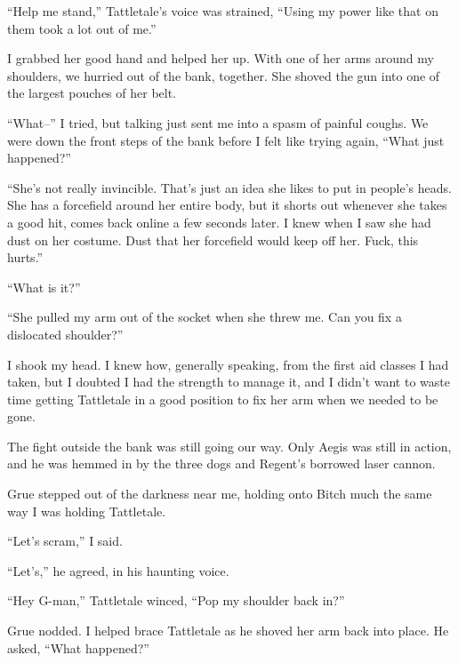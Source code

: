 ``Help me stand,'' Tattletale's voice was strained, ``Using my power like that on them took a lot out of me.''



I grabbed her good hand and helped her up.  With one of her arms around my shoulders, we hurried out of the bank, together.  She shoved the gun into one of the largest pouches of her belt.



``What--'' I tried, but talking just sent me into a spasm of painful coughs.  We were down the front steps of the bank before I felt like trying again, ``What just happened?''



``She's not really invincible.  That's just an idea she likes to put in people's heads.  She has a forcefield around her entire body, but it shorts out whenever she takes a good hit, comes back online a few seconds later.  I knew when I saw she had dust on her costume.  Dust that her forcefield would keep off her.  Fuck, this hurts.''



``What is it?''



``She pulled my arm out of the socket when she threw me.  Can you fix a dislocated shoulder?''



I shook my head.  I knew how, generally speaking, from the first aid classes I had taken, but I doubted I had the strength to manage it, and I didn't want to waste time getting Tattletale in a good position to fix her arm when we needed to be gone.



The fight outside the bank was still going our way.  Only Aegis was still in action, and he was hemmed in by the three dogs and Regent's borrowed laser cannon.



Grue stepped out of the darkness near me, holding onto Bitch much the same way I was holding Tattletale.



``Let's scram,'' I said.



``Let's,'' he agreed, in his haunting voice.



``Hey G-man,'' Tattletale winced, ``Pop my shoulder back in?''



Grue nodded.  I helped brace Tattletale as he shoved her arm back into place.  He asked, ``What happened?''



